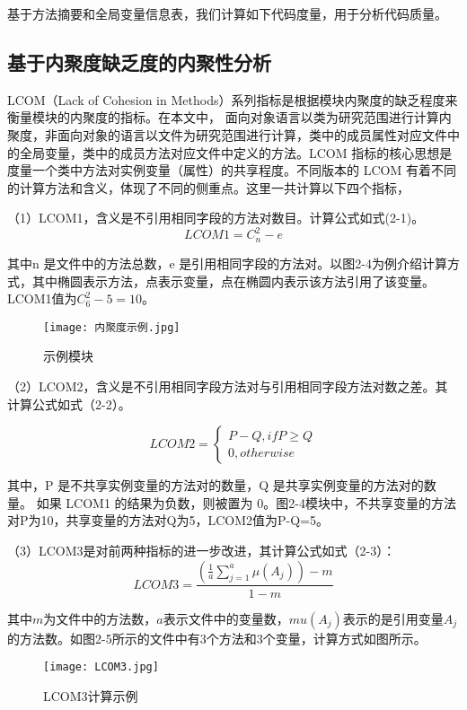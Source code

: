 基于方法摘要和全局变量信息表，我们计算如下代码度量，用于分析代码质量。


\subsection{基于内聚度缺乏度的内聚性分析}

LCOM（Lack of Cohesion in Methods）系列指标是根据模块内聚度的缺乏程度来衡量模块的内聚度的指标。在本文中，
面向对象语言以类为研究范围进行计算内聚度，非面向对象的语言以文件为研究范围进行计算，类中的成员属性对应文件中的全局变量，类中的成员方法对应文件中定义的方法。LCOM 指标的核心思想是度量一个类中方法对实例变量（属性）的共享程度。不同版本的 LCOM 有着不同的计算方法和含义，体现了不同的侧重点。这里一共计算以下四个指标，

（1）LCOM1，含义是不引用相同字段的方法对数目\cite{1994Ametr}。计算公式如式(2-1)。
\begin{equation}
LCOM1 = C_{n}^{2}-e
\end{equation}

其中n 是文件中的方法总数，e 是引用相同字段的方法对。以图2-4为例介绍计算方式，其中椭圆表示方法，点表示变量，点在椭圆内表示该方法引用了该变量。LCOM1值为\(C_{6}^{2} - 5 = 10\)。

\begin{figure}[h]
\centering
\texttt{[image: 内聚度示例.jpg]}
\caption{示例模块}
\end{figure}
    

（2）LCOM2，含义是不引用相同字段方法对与引用相同字段方法对数之差\cite{1996Coupling}。其计算公式如式（2-2）。

\begin{equation}
    {LCOM2}=\left\{
        \begin{array}
        {c}P-Q,  ifP\geq Q \\
        0,  otherwise
        \end{array}\right.
\end{equation}

其中，P 是不共享实例变量的方法对的数量，Q 是共享实例变量的方法对的数量。
如果 LCOM1 的结果为负数，则被置为 0。图2-4模块中，不共享变量的方法对P为10，共享变量的方法对Q为5，LCOM2值为P-Q=5。

（3）LCOM3是对前两种指标的进一步改进，其计算公式如式（2-3）：
\begin{equation}
LCOM3 = \frac{\left( \frac{1}{a} \sum_{j=1}^a \mu(A_j) \right) - m}{1 - m}
\end{equation}

其中\( m\)为文件中的方法数，\( a\)表示文件中的变量数，\( mu(A_j)\)表示的是引用变量\(A_j\)的方法数。如图2-5所示的文件中有3个方法和3个变量，计算方式如图所示。
\begin{figure}[h]
\centering
\texttt{[image: LCOM3.jpg]}
\caption{LCOM3计算示例}
\end{figure}



